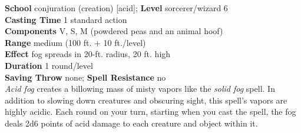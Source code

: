\textbf{School} conjuration (creation) [acid]; \textbf{Level} sorcerer/wizard 6\\
\textbf{Casting Time} 1 standard action\\
\textbf{Components} V, S, M (powdered peas and an animal hoof)\\
\textbf{Range }medium (100 ft. + 10 ft./level)\\
\textbf{Effect} fog spreads in 20-ft. radius, 20 ft. high\\
\textbf{Duration} 1 round/level\\
\textbf{Saving Throw} none; \textbf{Spell Resistance} no\\
\textit{Acid fog }creates a billowing mass of misty vapors like the \textit{solid fog }spell. In addition to slowing down creatures and obscuring sight, this spell's vapors are highly acidic. Each round on your turn, starting when you cast the spell, the fog deals 2d6 points of acid damage to each creature and object within it.\\
